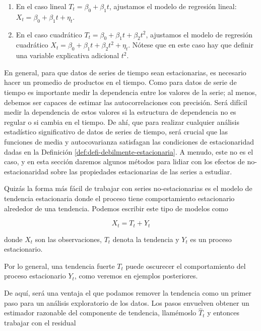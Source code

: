 \documentclass[12pt,]{krantz}
\theoremstyle{definition}
\theoremstyle{definition}
\theoremstyle{definition}
\theoremstyle{remark}
\begin{document}
\begin{enumerate}
\def\labelenumi{\arabic{enumi}.}
\item
  En el caso lineal \(T_t = \beta_0 + \beta_1t\), ajustamos el modelo de
  regresión lineal: \(X_t = \beta_0 + \beta_1t + \eta_t\).
\item
  En el caso cuadrático \(T_t = \beta_0 +\beta_1t+\beta_2t^2\),
  ajustamos el modelo de regresión cuadrático
  \(X_t = \beta_0+\beta_1t+\beta_2t^2 +\eta_t\). Nótese que en este caso
  hay que definir una variable explicativa adicional \(t^2\).
\end{enumerate}

En general, para que datos de series de tiempo sean estacionarias, es
necesario hacer un promedio de productos en el tiempo. Como para datos
de serie de tiempo es importante medir la dependencia entre los valores
de la serie; al menos, debemos ser capaces de estimar las
autocorrelaciones con precisión. Será difícil medir la dependencia de
estos valores si la estructura de dependencia no es regular o si cambia
en el tiempo. De ahí, que para realizar cualquier análisis estadístico
significativo de datos de series de tiempo, será crucial que las
funciones de media y autocovarianza satisfagan las condiciones de
estacionaridad dadas en la Definición
\ref{def:defi-debilmente-estacionaria}. A menudo, este no es el caso, y
en esta sección daremos algunos métodos para lidiar con los efectos de
no-estacionaridad sobre las propiedades estacionarias de las series a
estudiar.

Quizás la forma más fácil de trabajar con series no-estacionarias es el
modelo de tendencia estacionaria donde el proceso tiene comportamiento
estacionario alrededor de una tendencia. Podemos escribir este tipo de
modelos como

\begin{equation}
X_t=T_t+Y_t
\label{eq:eq-modelo-tendencia-estacionaria}
\end{equation}

donde \(X_t\) son las observaciones, \(T_t\) denota la tendencia y
\(Y_t\) es un proceso estacionario.

Por lo general, una tendencia fuerte \(T_t\) puede oscurecer el
comportamiento del proceso estacionario \(Y_t\), como veremos en
ejemplos posteriores.

De aquí, será una ventaja el que podamos remover la tendencia como un
primer paso para un análisis exploratorio de los datos. Los pasos
envuelven obtener un estimador razonable del componente de tendencia,
llamémoslo \(\hat{T}_t\) y entonces trabajar con el residual
\end{document}
